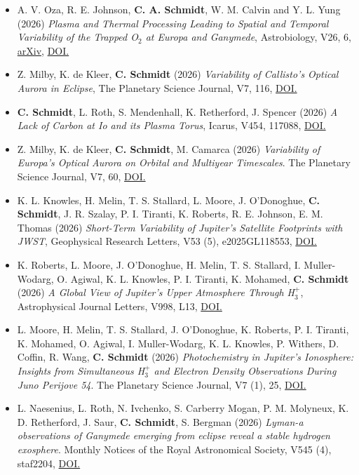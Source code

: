 \documentclass[12pt]{report}
\begin{document}
\begin{itemize} \itemsep -2pt %
  \item A. V. Oza, R. E. Johnson, \textbf{C. A. Schmidt}, W. M. Calvin and Y. L. Yung (2026) \textit{Plasma and Thermal Processing Leading to Spatial and Temporal Variability of the Trapped O$_2$ at Europa and Ganymede}, Astrobiology, V26, 6, \href{http://arxiv.org/abs/2504.04177}{arXiv}, \href{https://doi.org/10.1177/15311074261460369}{DOI.}
  \item Z. Milby, K. de Kleer, \textbf{C. Schmidt} (2026) \textit{Variability of Callisto's Optical Aurora in Eclipse}, The Planetary Science Journal, V7, 116, \href{https://doi.org/10.3847/PSJ/ae650c}{DOI.}  
  \item \textbf{C. Schmidt}, L. Roth, S. Mendenhall, K. Retherford, J. Spencer (2026) \textit{A Lack of Carbon at Io and its Plasma Torus}, Icarus, V454, 117088, \href{https://doi.org/10.1016/j.icarus.2026.117088}{DOI.}  
  \item Z. Milby, K. de Kleer, \textbf{C. Schmidt}, M. Camarca (2026) \textit{Variability of Europa's Optical Aurora on Orbital and Multiyear Timescales}. The Planetary Science Journal, V7, 60, \href{https://doi.org/10.3847/PSJ/ae47f4}{DOI.}  
  \item K. L. Knowles, H. Melin, T. S. Stallard, L. Moore, J. O’Donoghue, \textbf{C. Schmidt}, J. R. Szalay, P. I. Tiranti, K. Roberts, R. E. Johnson, E. M. Thomas (2026) \textit{Short-Term Variability of Jupiter’s Satellite Footprints with JWST}, Geophysical Research Letters, V53 (5), e2025GL118553, \href{https://doi.org/10.1029/2025GL118553}{DOI.}  
  \item K. Roberts, L. Moore, J. O’Donoghue, H. Melin, T. S. Stallard, I. Muller-Wodarg, O. Agiwal, K. L. Knowles, P. I. Tiranti, K. Mohamed, \textbf{C. Schmidt} (2026) \textit{A Global View of Jupiter’s Upper Atmosphere Through H$_3^+$}, Astrophysical Journal Letters, V998, L13, \href{https://doi.org/10.3847/2041-8213/ae3c9b}{DOI.}  
  \item L. Moore, H. Melin, T. S. Stallard, J. O’Donoghue, K. Roberts, P. I. Tiranti, K. Mohamed, O. Agiwal, I. Muller-Wodarg, K. L. Knowles, P. Withers, D. Coffin, R. Wang, \textbf{C. Schmidt} (2026) \textit{Photochemistry in Jupiter's Ionosphere: Insights from Simultaneous H$_3^+$ and Electron Density Observations During Juno Perijove 54}. The Planetary Science Journal, V7 (1), 25, \href{https://doi.org/10.3847/PSJ/ae2f49}{DOI.}  
  \item L. Naesenius, L. Roth, N. Ivchenko, S. Carberry Mogan, P. M. Molyneux, K. D. Retherford, J. Saur, \textbf{C. Schmidt}, S. Bergman (2026) \textit{Lyman-a observations of Ganymede emerging from eclipse reveal a stable hydrogen exosphere}. Monthly Notices of the Royal Astronomical Society, V545 (4), staf2204, \href{https://doi.org/10.1093/mnras/staf2204}{DOI.}  

\end{itemize}
\end{document}
